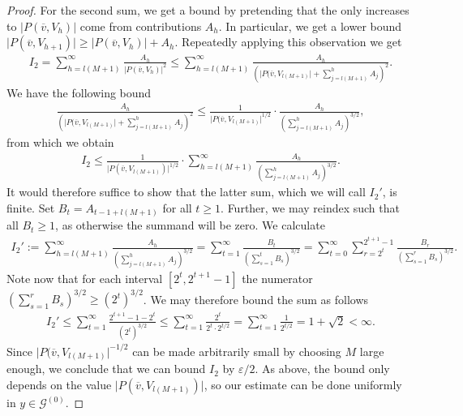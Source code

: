 \documentclass[11pt,a4paper,oneside,final,reqno]{amsart}
\theoremstyle{definition}
\newcommand{\Go}{\mathcal{G}^{(0)}}
\numberwithin{equation}{section}
\begin{document}
\begin{proof}
		
		
		For the second sum, we get a bound by pretending that the only increases to $\vert P(\overline{v}, V_h)\vert$ come from contributions $A_h$. In particular, we get a lower bound $\vert P(\overline{v} , V_{h+1}) \vert \geq \vert P(\overline{v}, V_h) \vert + A_h$. Repeatedly applying this observation we get
		\begin{align*}
			I_2 = \sum_{h = l(M+1)}^{\infty} \frac{  A_h}{\vert P(\overline{v} , V_h) \vert^2} 
			\leq \sum_{h= l(M+1)}^\infty \frac{A_h}{\left( \vert P(\overline{v} , V_{l(M+1)} \vert  + \sum_{j=l(M+1)}^{h} A_j \right)^2} .
		\end{align*}
		We have the following bound
		\begin{align*}
			\frac{A_h}{\left( \vert P(\overline{v} , V_{l(M+1)} \vert + \sum_{j=l(M+1)}^{h} A_j \right)^2} \leq \frac{1}{\vert P(\overline{v} , V_{l(M+1)} \vert^{1/2}} \cdot \frac{A_h}{(\sum_{j= l(M+1)}^{h} A_j)^{3/2}},
		\end{align*}
		from which we obtain
		\begin{align*}
			I_2 \leq \frac{1}{\vert P(\overline{v} , V_{l(M+1)}) \vert^{1/2}} \cdot \sum_{h = l(M+1)}^{\infty} \frac{A_h}{(\sum_{j= l(M+1)}^{h} A_j)^{3/2}}	.		
		\end{align*}
		It would therefore suffice to show that the latter sum, which we will call $I_2'$, is finite. 
		Set $B_t = A_{t -1 + l(M+1)}$ for all $t \geq 1$. Further, we may reindex such that all $B_t \geq 1$, as otherwise the summand will be zero. We calculate
		\begin{align*}
			I_2' :=\sum_{h = l(M+1)}^{\infty} \frac{A_h}{(\sum_{j= l(M+1)}^{h} A_j)^{3/2}} = \sum_{t=1}^{\infty} \frac{B_t}{(\sum_{s=1}^{t} B_s)^{3/2}} 
			= \sum_{t=0}^\infty \sum_{r=2^t}^{2^{t+1}-1} \frac{B_r}{( \sum_{s=1}^{r} B_s)^{3/2}} .
		\end{align*}
		Note now that for each interval $[2^t , 2^{t+1}-1]$ the numerator $(\sum_{s=1}^{r} B_s)^{3/2} \geq (2^t)^{3/2}$. We may therefore bound the sum as follows
		\begin{align*}
			I_2' \leq \sum_{t=1}^\infty \frac{2^{t+1} - 1 - 2^t}{(2^t)^{3/2}} \leq \sum_{t=1}^\infty \frac{2^t}{2^t \cdot 2^{t/2}} = \sum_{t=1}^{\infty} \frac{1}{2^{t/2}} = 1 + \sqrt{2} < \infty.
		\end{align*}
		Since $\vert P(\overline{v} , V_{l(M+1)} \vert^{-1/2}$ can be made arbitrarily small by choosing $M$ large enough, 
		we conclude that we can bound $I_2$ by  $\varepsilon/2$. 
		As above,  
		the bound only depends on the value $\vert P(\overline{v} , V_{l(M+1)}) \vert$, so our estimate can be done uniformly in $y \in \Go$.
		

\end{proof}
\end{document}
